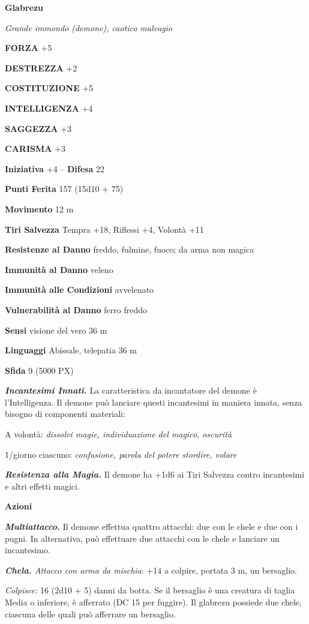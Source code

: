 \begin{multicols}{2}
	\medskip{}\textbf{Glabrezu}

	\textit{Grande immondo (demone), caotico malvagio}

	\textbf{FORZA} +5

	\textbf{DESTREZZA} +2

	\textbf{COSTITUZIONE} +5

	\textbf{INTELLIGENZA} +4

	\textbf{SAGGEZZA} +3

	\textbf{CARISMA} +3

	\textbf{Iniziativa} +4 -- \textbf{Difesa} 22

	\textbf{Punti Ferita} 157 (15d10 + 75)

	\textbf{Movimento} 12 m

	\textbf{Tiri Salvezza} Tempra +18, Riflessi +4, Volontà +11

	\textbf{Resistenze al Danno} freddo, fulmine, fuoco; da arma non magica

	\textbf{Immunità al Danno} veleno

	\textbf{Immunità alle Condizioni} avvelenato

	\textbf{Vulnerabilità al Danno} ferro freddo

	\textbf{Sensi} visione del vero 36 m

	\textbf{Linguaggi} Abissale, telepatia 36 m

	\textbf{Sfida} 9 (5000 PX)

	\textit{\textbf{Incantesimi Innati.}} La caratteristica da incantatore del demone è l'Intelligenza. Il demone può lanciare questi incantesimi in maniera innata, senza bisogno di componenti materiali:

	A volontà: \textit{dissolvi magie, individuazione del magico, oscurità}

	1/giorno ciascuno: \textit{confusione, parola del potere stordire, volare}

	\textit{\textbf{Resistenza alla Magia.}} Il demone ha +1d6 ai Tiri Salvezza contro incantesimi e altri effetti magici.

	\textbf{Azioni}

	\textit{\textbf{Multiattacco.}} Il demone effettua quattro attacchi: due con le chele e due con i pugni. In alternativa, può effettuare due attacchi con le chele e lanciare un incantesimo.

	\textit{\textbf{Chela.} Attacco con arma da mischia}: +14 a colpire, portata 3 m, un bersaglio.

	\textit{Colpisce:} 16 (2d10 + 5) danni da botta. Se il bersaglio è una creatura di taglia Media o inferiore, è afferrato (DC 15 per fuggire). Il glabrezu possiede due chele, ciascuna delle quali può afferrare un bersaglio.


\end{multicols}
